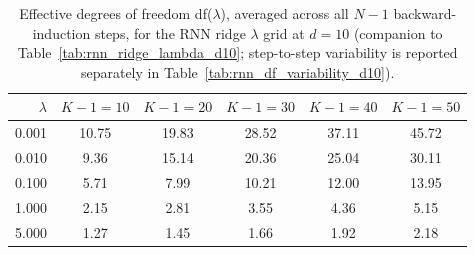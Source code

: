 \begin{table}

\caption{\label{tab:rnn_ridge_lambda_df_d10}Effective degrees of freedom df($\lambda$), averaged across all $N-1$ backward-induction steps, for the RNN ridge $\lambda$ grid at $d=10$ (companion to Table~\ref{tab:rnn_ridge_lambda_d10}; step-to-step variability is reported separately in Table~\ref{tab:rnn_df_variability_d10}).}
\footnotesize
\setlength{\tabcolsep}{4pt}
\centering
\begin{tabular}[t]{rccccc}
\toprule
$\lambda$ & $K-1=10$ & $K-1=20$ & $K-1=30$ & $K-1=40$ & $K-1=50$\\
\midrule
0.001 & 10.75 & 19.83 & 28.52 & 37.11 & 45.72\\
0.010 & 9.36 & 15.14 & 20.36 & 25.04 & 30.11\\
0.100 & 5.71 & 7.99 & 10.21 & 12.00 & 13.95\\
1.000 & 2.15 & 2.81 & 3.55 & 4.36 & 5.15\\
5.000 & 1.27 & 1.45 & 1.66 & 1.92 & 2.18\\
\bottomrule
\end{tabular}
\end{table}
